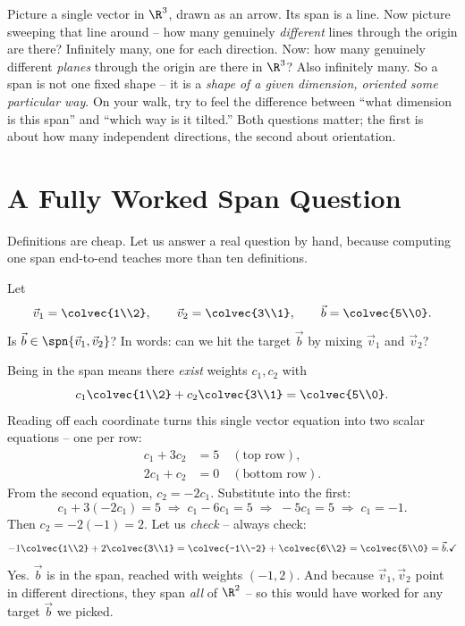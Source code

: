 \begin{walkbox}
Picture a single vector in $\R^3$, drawn as an arrow. Its span is a line. Now picture sweeping that line around -- how many genuinely \emph{different} lines through the origin are there? Infinitely many, one for each direction. Now: how many genuinely different \emph{planes} through the origin are there in $\R^3$? Also infinitely many. So a span is not one fixed shape -- it is a \emph{shape of a given dimension, oriented some particular way}. On your walk, try to feel the difference between ``what dimension is this span'' and ``which way is it tilted.'' Both questions matter; the first is about how many independent directions, the second about orientation.
\end{walkbox}

\section{A Fully Worked Span Question}

Definitions are cheap. Let us answer a real question by hand, because computing one span end-to-end teaches more than ten definitions.

\begin{example}\label{ch03:ex-in-span}
Let
\[
  \vec{v}_1 = \colvec{1\\2}, \qquad \vec{v}_2 = \colvec{3\\1}, \qquad \vec{b} = \colvec{5\\0}.
\]
Is $\vec{b} \in \spn\{\vec{v}_1, \vec{v}_2\}$? In words: can we hit the target $\vec{b}$ by mixing $\vec{v}_1$ and $\vec{v}_2$?
\end{example}

Being in the span means there \emph{exist} weights $c_1, c_2$ with
\[
  c_1\colvec{1\\2} + c_2\colvec{3\\1} = \colvec{5\\0}.
\]
Reading off each coordinate turns this single vector equation into two scalar equations -- one per row:
\[
  \begin{aligned}
    c_1 + 3c_2 &= 5 \quad (\text{top row}),\\
    2c_1 + c_2 &= 0 \quad (\text{bottom row}).
  \end{aligned}
\]
From the second equation, $c_2 = -2c_1$. Substitute into the first:
\[
  c_1 + 3(-2c_1) = 5 \;\Longrightarrow\; c_1 - 6c_1 = 5 \;\Longrightarrow\; -5c_1 = 5 \;\Longrightarrow\; c_1 = -1.
\]
Then $c_2 = -2(-1) = 2$. Let us \emph{check} -- always check:
\[
  -1\colvec{1\\2} + 2\colvec{3\\1}
  = \colvec{-1\\-2} + \colvec{6\\2}
  = \colvec{5\\0} = \vec{b}. \checkmark
\]
Yes. $\vec{b}$ is in the span, reached with weights $(-1, 2)$. And because $\vec{v}_1, \vec{v}_2$ point in different directions, they span \emph{all} of $\R^2$ -- so this would have worked for any target $\vec{b}$ we picked.

